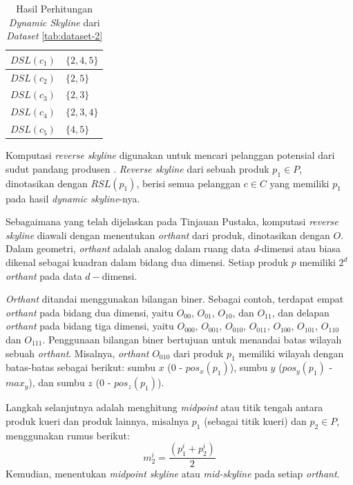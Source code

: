 \begin{table}[H]
	\small
	\centering
	\begin{tabular}{|p{2cm}|p{3cm}|}
		\hline
		$DSL(c_1)$ & $\{2, 4, 5\}$ \\ \hline
		$DSL(c_2)$ & $\{2, 5\}$ \\ \hline
		$DSL(c_3)$ & $\{2, 3\}$ \\ \hline
		$DSL(c_4)$ & $\{2, 3, 4\}$\\ \hline
		$DSL(c_5)$ & $\{4, 5\}$ \\ \hline
	\end{tabular} 
	\caption{Hasil Perhitungan \textit{Dynamic Skyline} dari \textit{Dataset} \ref{tab:dataset-2}}
	\label{tab:dsl-res}
\end{table}



Komputasi \textit{reverse skyline} digunakan untuk mencari pelanggan potensial dari sudut pandang produsen \cite{kmpp}. \textit{Reverse skyline} \cite{reverse-skyline} dari sebuah produk $p_1 \in
P$, dinotasikan dengan $RSL(p_1)$, berisi semua pelanggan $c \in C$ yang memiliki $p_1$ pada hasil \textit{dynamic skyline}-nya.

Sebagaimana yang telah dijelaskan pada Tinjauan Pustaka, komputasi \textit{reverse skyline} diawali dengan menentukan \textit{orthant} dari produk, dinotasikan dengan $O$. Dalam geometri, \textit{orthant} adalah analog dalam ruang data \textit{d}-dimensi atau biasa dikenal sebagai kuadran dalam bidang dua dimensi. Setiap produk $p$ memiliki $2^d$ \textit{orthant} pada data $d-$dimensi. 

\textit{Orthant} ditandai menggunakan bilangan biner. Sebagai contoh, terdapat empat \textit{orthant} pada bidang dua dimensi, yaitu $O_{00}$, $O_{01}$, $O_{10}$, dan $O_{11}$, dan delapan \textit{orthant} pada bidang tiga dimensi, yaitu $O_{000}$, $O_{001}$, $O_{010}$, $O_{011}$, $O_{100}$, $O_{101}$, $O_{110}$ dan $O_{111}$. Penggunaan bilangan biner bertujuan untuk menandai batas wilayah sebuah \textit{orthant}. Misalnya, \textit{orthant} $O_{010}$ dari produk $p_1$ memiliki wilayah dengan batas-batas sebagai berikut: sumbu $x$ (0 - $pos_x(p_1)$), sumbu $y$ ($pos_y(p_1)$ - $max_y$), dan sumbu $z$ (0 - $pos_z(p_1)$).

Langkah selanjutnya adalah menghitung \textit{midpoint} atau titik tengah antara produk kueri dan produk lainnya, misalnya $p_1$ (sebagai titik kueri) dan $p_2 \in P$, menggunakan rumus berikut: 
\begin{equation} \label{eq:midpoint2}
m_2^i = \frac{(p_1^i + p_2^i)}{2}
\end{equation}
Kemudian, menentukan \textit{midpoint skyline} atau \textit{mid-skyline} \cite{mid-skyline} pada setiap \textit{orthant}.

